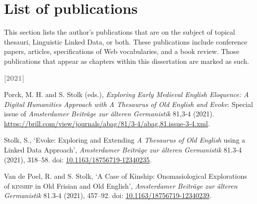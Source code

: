 \section*{List of publications}

This section lists the author's publications that are on the subject of topical thesauri, Linguistic Linked Data, or both. These publications include conference papers, articles, specifications of Web vocabularies, and a book review. Those publications that appear as chapters within this dissertation are marked as such.

\begin{list}{}%
{\leftmargin=0.5in \itemindent=-0.5in}
\setlength{\itemsep}{0pt}
\setlength{\parskip}{0pt}
\setlength{\parsep}{0pt}

\begin{comment}
\item
\textcolor{gray}{\textbf{[2022]}}
%
\item
Stolk, S., W. Lubbers, F. Braakman, and S. Weitkamp, `Ontologies and JSON-LD at TenneT: The Use of Linked Data on EU-303 Projects', Proceedings of LDAC 2022, Hersonissos, 29 May 2022. \url{https://linkedbuildingdata.net/ldac2022/files/papers/paper02.pdf}. 
\lbl{Conference paper}
\end{comment}

\bigskip\item
\textcolor{gray}{\textbf{[2021]}}
%
\item
Porck, M. H. and S. Stolk (eds.), \textit{Exploring Early Medieval English Eloquence: A Digital Humanities Approach with A Thesaurus of Old English and Evoke}: Special issue of \textit{Amsterdamer Beiträge zur älteren Germanistik} 81,3-4  (2021). \url{https://brill.com/view/journals/abag/81/3-4/abag.81.issue-3-4.xml}. 

\item
Stolk, S., `Evoke: Exploring and Extending \textit{A Thesaurus of Old English} using a Linked Data Approach', \textit{Amsterdamer Beiträge zur älteren Germanistik} 81.3-4 (2021), 318–58. doi: \href{https://doi.org/10.1163/18756719-12340235}{\url{10.1163/18756719-12340235}}. 

\item
Van de Poel, R. and S. Stolk, `A Case of Kinship: Onomasiological Explorations of \textsc{kinship} in Old Frisian and Old English', \textit{Amsterdamer Beiträge zur älteren Germanistik} 81.3-4 (2021), 457–92. doi: \href{https://doi.org/10.1163/18756719-12340239}{\url{10.1163/18756719-12340239}}. 


\end{list}
